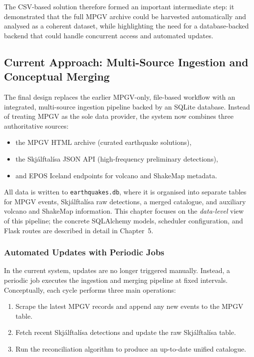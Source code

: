 \documentclass[12pt]{article}
\begin{document}
The CSV-based solution therefore formed an important intermediate step: it demonstrated that the full MPGV archive could be harvested automatically and analysed as a coherent dataset, while highlighting the need for a database-backed backend that could handle concurrent access and automated updates.

\vspace{0.4cm}

\subsection{Current Approach: Multi-Source Ingestion and Conceptual Merging}

The final design replaces the earlier MPGV-only, file-based workflow with an integrated, multi-source ingestion pipeline backed by an SQLite database. Instead of treating MPGV as the sole data provider, the system now combines three authoritative sources:

\begin{itemize}
    \item the MPGV HTML archive (curated earthquake solutions),
    \item the Skjálftalísa JSON API (high-frequency preliminary detections),
    \item and EPOS Iceland endpoints for volcano and ShakeMap metadata.
\end{itemize}

All data is written to \texttt{earthquakes.db}, where it is organised into separate tables for MPGV events, Skjálftalísa raw detections, a merged catalogue, and auxiliary volcano and ShakeMap information. This chapter focuses on the \emph{data-level} view of this pipeline; the concrete SQLAlchemy models, scheduler configuration, and Flask routes are described in detail in Chapter~5.

\subsubsection*{Automated Updates with Periodic Jobs}

In the current system, updates are no longer triggered manually. Instead, a periodic job executes the ingestion and merging pipeline at fixed intervals. Conceptually, each cycle performs three main operations:

\begin{enumerate}
    \item Scrape the latest MPGV records and append any new events to the MPGV table.
    \item Fetch recent Skjálftalísa detections and update the raw Skjálftalísa table.
    \item Run the reconciliation algorithm to produce an up-to-date unified catalogue.
\end{enumerate}
\end{document}
